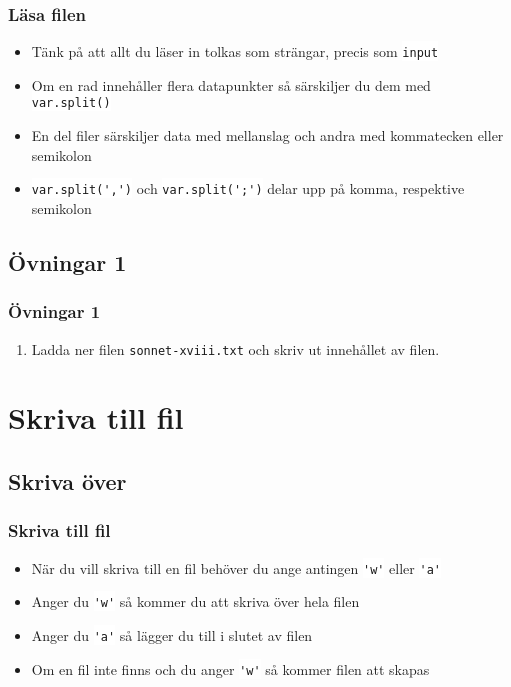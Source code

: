 \documentclass[aspectratio=169]{beamer}
\newcommand{\code}[1]{\colorbox{white}{\lstinline{#1}}}
\begin{document}
\begin{frame}[fragile]
	\frametitle{Läsa filen}
	
	\begin{itemize}
		\item Tänk på att allt du läser in tolkas som strängar, precis som \code{input}
		\item Om en rad innehåller flera datapunkter så särskiljer du dem med \code{var.split()}
		\item En del filer särskiljer data med mellanslag och andra med kommatecken eller semikolon
		\item \code{var.split(',')} och \code{var.split(';')} delar upp på komma, respektive semikolon
	\end{itemize}
	
\end{frame}

\subsection{Övningar 1}

\begin{frame}
	\frametitle{Övningar 1}
	
	\begin{enumerate}
		\item Ladda ner filen \texttt{sonnet-xviii.txt} och skriv ut innehållet av filen.
	\end{enumerate}
	
\end{frame}

\section{Skriva till fil}

\subsection{Skriva över}

\begin{frame}[fragile]
	\frametitle{Skriva till fil}
	
	\begin{itemize}
		\item När du vill skriva till en fil behöver du ange antingen \code{'w'} eller \code{'a'}
		\item Anger du \code{'w'} så kommer du att skriva över hela filen
		\item Anger du \code{'a'} så lägger du till i slutet av filen
		\item Om en fil inte finns och du anger \code{'w'} så kommer filen att skapas
	\end{itemize}
	
\end{frame}
\end{document}
